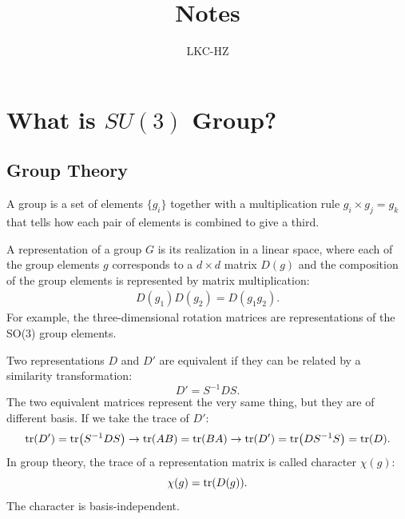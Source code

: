 \documentclass[12pt]{article}
\title{Notes}
\author{LKC-HZ}
\date{}
\begin{document}
	
	\maketitle
	
	\tableofcontents
	
	
	\section{What is $SU(3)$ Group?}
	\subsection{Group Theory \label{group theory basics section}}
	A group is a set of elements $\{g_i\}$ together with a multiplication rule $g_i \times g_j = g_k$ that tells how each pair of elements is combined to give a third.
	
	A representation of a group $G$ is its realization in a linear space, where each of the group elements $g$ corresponds to a $d \times d$ matrix $D(g)$ and the composition of the group elements is represented by matrix multiplication: 
	\begin{align}
		D(g_1)D(g_2) = D(g_1g_2).    
	\end{align}
	For example, the three‑dimensional rotation matrices are representations of the SO(3) group elements. 
	
	Two representations $D$ and $D'$ are equivalent if they can be related by a similarity transformation:
	\begin{equation}
		D' = S^{-1}DS.
	\end{equation}
	The two equivalent matrices represent the very same thing, but they are of different basis. If we take the trace of $D'$:
	\begin{align}
		\tr(D') = \tr(S^{-1}DS) \rightarrow \tr(AB) = \tr(BA) \rightarrow \tr(D') = \tr(DS^{-1}S ) = \tr(D).
	\end{align}
	In group theory, the trace of a representation matrix is called character $\chi(g)$:
	\begin{equation}
		\chi(g) = \tr(D(g)).
	\end{equation}
	The character is basis-independent. 
	
\end{document}
